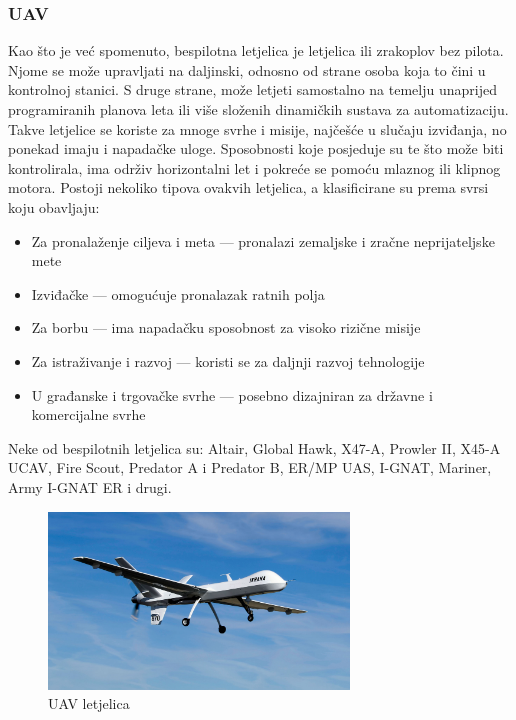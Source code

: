 \documentclass[times, utf8, diplomski]{fer}
\begin{document}
\subsubsection{UAV}\label{sec:UAV}
Kao što je već spomenuto, bespilotna letjelica je letjelica ili zrakoplov bez pilota. Njome se može upravljati na daljinski, odnosno od strane osoba koja to čini u kontrolnoj stanici. S druge strane, može letjeti samostalno na temelju unaprijed programiranih planova leta ili više složenih dinamičkih sustava za automatizaciju. Takve letjelice se koriste za mnoge svrhe i misije, najčešće u slučaju izviđanja, no ponekad imaju i napadačke uloge. Sposobnosti koje posjeduje su te što može biti kontrolirala, ima održiv horizontalni let i pokreće se pomoću mlaznog ili klipnog motora. Postoji nekoliko tipova ovakvih letjelica, a klasificirane su prema svrsi koju obavljaju:
\begin{itemize}
\item Za pronalaženje ciljeva i meta --- pronalazi zemaljske i zračne neprijateljske mete 
\item Izviđačke --- omogućuje pronalazak ratnih polja
\item Za borbu --- ima napadačku sposobnost za visoko rizične misije
\item Za istraživanje i razvoj --- koristi se za daljnji razvoj tehnologije
\item U građanske i trgovačke svrhe --- posebno dizajniran za državne i komercijalne svrhe
\end{itemize}
Neke  od  bespilotnih  letjelica  su:  Altair,  Global  Hawk,  X47-A, Prowler II, X45-A UCAV, Fire Scout, Predator A i Predator B, ER/MP UAS, I-GNAT, Mariner, Army I-GNAT ER i drugi.
\begin{figure}[htb]
\centering
\includegraphics[width=8cm]{img/UAV.png}
\caption{UAV letjelica\protect\footnotemark}
\label{fig:UAV letjelica}
\end{figure}
\end{document}
